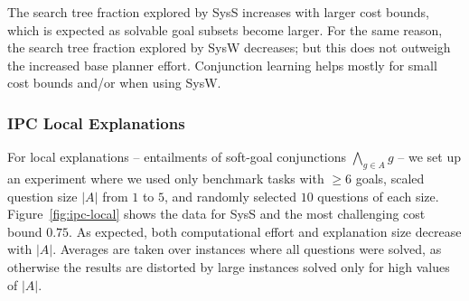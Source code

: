 The search tree fraction explored by SysS increases with larger cost
bounds, which is expected as solvable goal subsets become larger. For
the same reason, the search tree fraction explored by SysW decreases;
but this does not outweigh the increased base planner
effort. Conjunction learning helps mostly for small cost bounds and/or
when using SysW.
%
%



\subsubsection{IPC Local Explanations}

For local explanations -- entailments of soft-goal conjunctions
$\bigwedge_{g \in A} g$ -- we set up an experiment where we used only
benchmark tasks with $\geq 6$ goals, scaled question size $|A|$ from
$1$ to $5$, and randomly selected $10$ questions of each
size. Figure~\ref{fig:ipc-local} shows the data for SysS and the most
challenging cost bound $0.75$.
%
As expected, both computational effort and explanation size decrease
with $|A|$.
%
Averages are taken over instances where all questions were solved, as
otherwise the results are distorted by large instances solved only for
high values of $|A|$.


